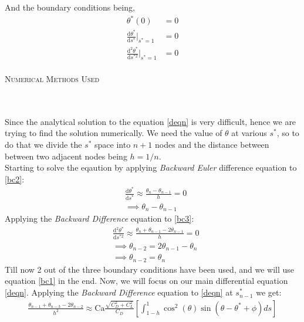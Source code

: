 \documentclass[a4paper,12pt]{report}
\begin{document}
And the boundary conditions being,
\begin{align}
\theta^*(0)&=0\\ \label{bc1}
\frac{\mathrm{d}\theta^*}{\mathrm{d}s^*}\Big|_{s^*=1} &= 0\\\label{bc2}
\frac{\mathrm{d}^2\theta^*}{\mathrm{d}s^{*2}}\Big|_{s^*=1} &= 0\\\label{bc3}
\end{align}
\pagebreak
\begin{center}
		\Large
		\textsc{Numerical Methods Used}\\\normalsize
\end{center}
\vspace{-3ex}
\underline{\hspace{6.27in}}
\hfill\\
\hfill\\
Since the analytical solution to the equation \eqref{deqn} is very difficult, hence we are trying to find the solution numerically. We need the value of $\theta$ at various $s^*$, so to do that we divide the $s^*$ space into $n+1$ nodes and the distance between between two adjacent nodes being $h = 1/n$.
\hfill\\
Starting to solve the eqaution by applying \textit{Backward Euler} difference equation to \eqref{bc2}:
\begin{align}
&\frac{\mathrm{d}\theta^*}{\mathrm{d}s^*}\approx \frac{\theta_n - \theta_{n-1}}{h}  = 0\\
&\implies \theta_n - \theta_{n-1}
\end{align}
Applying the \textit{Backward Difference} equation to \eqref{bc3}:
\begin{align}
&\frac{\mathrm{d^2}\theta^*}{\mathrm{d}s^{*2}}\approx \frac{\theta_n +\theta_{n-1}- 2\theta_{n-1}}{h}  = 0\\
&\implies \theta_{n-2} = 2\theta_{n-1}-\theta_{n}\\
&\implies \theta_{n-2} = \theta_{n}
\end{align}
Till now 2 out of the three boundary conditions have been used, and we will use equation \eqref{bc1} in the end. Now, we will focus on our main differential equation \eqref{deqn}. Applying the \textit{Backward Difference} equation to \eqref{deqn} at $s^*_{n-1}$ we get:
\begin{align}
\frac{\theta_{n-1}+\theta_{n-3}-2\theta_{n-2}}{h^2} \approx\text{Ca}\frac{\sqrt{C_D^2+C_L^2}}{C_D}\left[\int_{1-h}^{1} \cos^2(\theta)\sin\left(\theta - \theta^*+\phi\right) ds\right]
\end{align}
\end{document}
